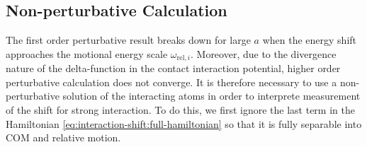 \subsection{Non-perturbative Calculation}

The first order perturbative result breaks down for large $a$ when the energy shift
approaches the motional energy scale $\omega_{\mathrm{rel},i}$.
Moreover, due to the divergence nature of the delta-function in the contact interaction potential,
higher order perturbative calculation does not converge.
It is therefore necessary to use a non-perturbative solution of the interacting atoms
in order to interprete measurement of the shift for strong interaction.
To do this, we first ignore the last term in the Hamiltonian
\ref{eq:interaction-shift:full-hamiltonian} so that it is fully separable
into COM and relative motion.


